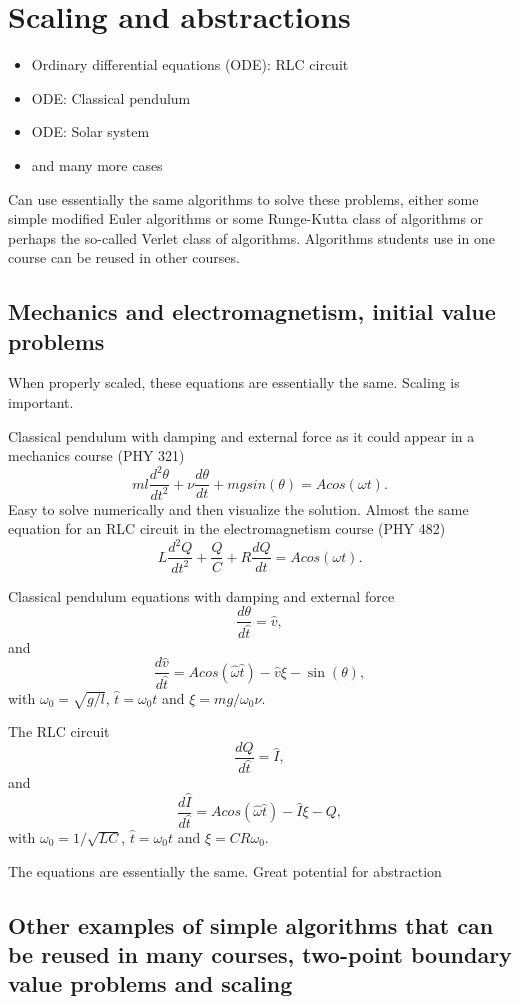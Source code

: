 \chapter{Scaling and abstractions}

\begin{itemize}
\item Ordinary differential equations (ODE): RLC circuit
\item ODE: Classical pendulum
\item ODE: Solar system
\item and many more cases
\end{itemize}
Can use essentially the same algorithms to solve these problems, either some simple modified Euler algorithms or some Runge-Kutta class of algorithms or perhaps the so-called Verlet class of algorithms.  Algorithms students use in one course can be reused in other courses.

\section{Mechanics and electromagnetism, initial value problems}
When properly scaled, these equations are essentially the same. Scaling is important.

Classical pendulum with damping and external force as it could appear in a mechanics course (PHY 321)
\[
  ml\frac{d^2\theta}{dt^2}+\nu\frac{d\theta}{dt}  +mgsin(\theta)=Acos(\omega t).
\]
Easy to solve numerically and then visualize the solution.
Almost the same equation for an RLC circuit in the electromagnetism course (PHY 482)
\[
L\frac{d^2Q}{dt^2}+\frac{Q}{C}+R\frac{dQ}{dt}=Acos(\omega t).
\]

Classical pendulum equations with damping and external force
\[
   \frac{d\theta}{d\hat{t}} =\hat{v},
\]
and
\[
   \frac{d\hat{v}}{d\hat{t}} =Acos(\hat{\omega} \hat{t})-\hat{v}\xi-\sin(\theta),
\]
with $\omega_0=\sqrt{g/l}$, $\hat{t}=\omega_0 t$ and $\xi = mg/\omega_0\nu$.

The RLC circuit
\[
   \frac{dQ}{d\hat{t}} =\hat{I},
\]
and
\[
   \frac{d\hat{I}}{d\hat{t}} =Acos(\hat{\omega} \hat{t})-\hat{I}\xi-Q,
\]
with $\omega_0=1/\sqrt{LC}$, $\hat{t}=\omega_0 t$ and $\xi = CR\omega_0$.

The equations are essentially the same. Great potential for abstraction





\section{Other examples of simple algorithms that can be reused in many courses, two-point boundary value problems and scaling}

